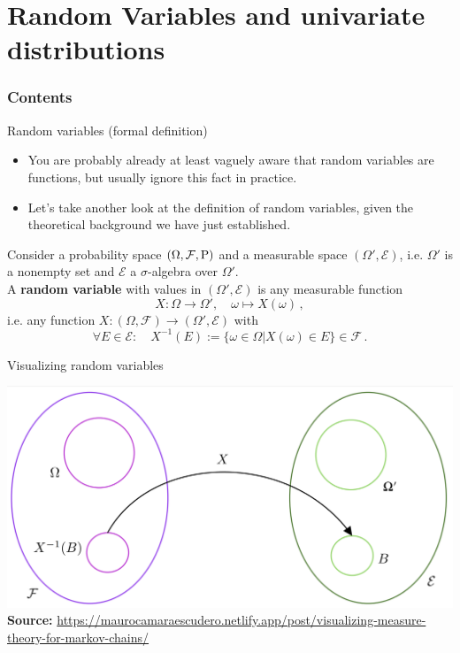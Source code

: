 \documentclass[a4,11pt]{beamer}
\newlength{\wideitemsep}
\let\olditem\item
\renewcommand{\item}{\setlength{\itemsep}{\wideitemsep}\olditem}
\begin{document}
\section{Random Variables and univariate distributions}
  {
     \begin{frame}
     \frametitle{Contents}
     \tableofcontents[currentsection]
     \end{frame}
  }
\begin{frame}{Random variables (formal definition)}
    \begin{itemize}
        \item You are probably already at least vaguely aware that random variables are functions, but usually ignore this fact in practice.
        \item Let's take another look at the definition of random variables, given the theoretical background we have just established.
    \end{itemize}
    \begin{definition}
        Consider a probability space $(\Omega,\mathcal{F},\operatorname{P})$ and a measurable space $(\Omega',\mathcal{E})$, i.e. $\Omega'$ is a nonempty set and $\mathcal{E}$ a $\sigma$-algebra over $\Omega'$.\\ A \textbf{random variable} with values in $(\Omega',\mathcal{E})$ is any measurable function $$X:\Omega\longrightarrow\Omega',\quad \omega\mapsto X(\omega)\,,$$
        i.e. any function $X:(\Omega,\mathcal{F})\longrightarrow(\Omega',\mathcal{E})$ with $$\forall E\in\mathcal{E}:\quad X^{-1}(E):=\{\omega\in\Omega\vert X(\omega)\in E\}\in\mathcal{F}\,.$$
    \end{definition}
\end{frame}
\begin{frame}{Visualizing random variables}
       \begin{center}
       \includegraphics[width=\linewidth]{graphics/RandomVariable1.png}\bigskip\\
       {\tiny \textbf{Source:} \url{https://maurocamaraescudero.netlify.app/post/visualizing-measure-theory-for-markov-chains/}}
   \end{center} 
\end{frame}
\end{document}
